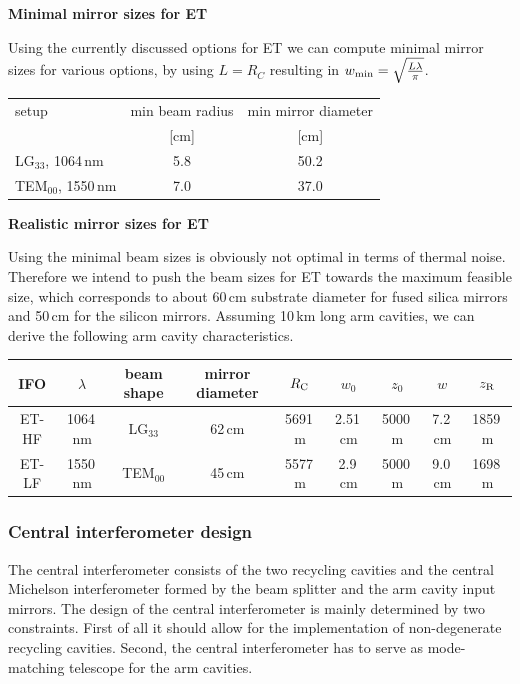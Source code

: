 \textbf{Minimal mirror sizes for ET}

Using the currently discussed options for ET we can compute minimal mirror sizes for various options, by using $L=R_{C}$ resulting in $w_{\rm min}=\sqrt{\frac{L\lambda}{\pi}}$.
\begin{center}
\begin{tabular}{|l|c|c|}
	\hline
setup & min beam radius  & min mirror diameter \\
         & [cm] & [cm] \\
	\hline
LG$_{33}$, 1064\,nm  &  5.8      &  50.2     \\
	\hline
TEM$_{00}$, 1550\,nm  &  7.0      &   37.0    \\
	\hline
\end{tabular}
\end{center}

\textbf{Realistic mirror sizes for ET}

Using the minimal beam sizes is obviously not optimal in terms of thermal noise. Therefore we intend to push the beam sizes for ET towards the maximum feasible size, which corresponds to about 60\,cm substrate diameter for fused silica mirrors and 50\,cm for the silicon mirrors. Assuming 10\,km long arm cavities, we can derive the following arm cavity characteristics.

\begin{center}
\begin{tabular}{|c|c|c|c|c|c|c|c|c|}
  \hline
IFO & $\lambda$& beam shape & mirror diameter & $R_{\rm C}$ & $w_0$ &$z_0$ & $w$ & $z_{\rm R}$ \\
\hline
ET-HF & 1064\,nm & LG$_{33}$ & 62\,cm & 5691\,m & 2.51\,cm & 5000\,m & 7.2\,cm & 1859\,m\\
\hline
ET-LF & 1550\,nm & TEM$_{00}$ & 45\,cm &5577\,m & 2.9\,cm & 5000\,m & 9.0\,cm & 1698\,m\\
\hline
\end{tabular}
\end{center}


\FloatBarrier
\subsubsection{Central interferometer design}
\label{sec:opt_layout_CITF}

The central interferometer consists of the two recycling cavities and the central Michelson interferometer formed by the beam splitter and the arm cavity input mirrors. The design of the central interferometer is mainly determined by two constraints. First of all it should allow for the implementation of non-degenerate recycling cavities. Second, the central interferometer has to serve as mode-matching telescope for the arm cavities.

